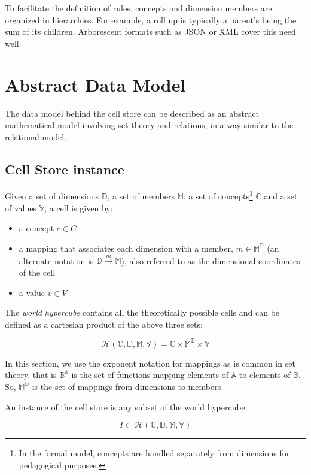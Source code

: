 \documentclass{acm_proc_article-sp}
\begin{document}
To facilitate the definition of rules, concepts and dimension members are organized in hierarchies. For example, a roll up is typically a parent's being the sum of its children. Arborescent formats such as JSON or XML cover this need well.

\section{Abstract Data Model}
\label{section-abstract-data-model}
The data model behind the cell store can be described as an abstract mathematical model involving set theory and relations, in a way similar to the relational model.
\subsection{Cell Store instance}

Given a set of dimensions $\mathbb{D}$, a set of members $\mathbb{M}$, a set of concepts\footnote{In the formal model, concepts are handled separately from dimensions for pedagogical purposes.} $\mathbb{C}$ and a set of values $\mathbb{V}$, a cell is given by:

\vspace{-\topsep}
\begin{itemize}
\item a concept $c \in C$
\item a mapping that associates each dimension with a member, $m \in \mathbb{M}^\mathbb{D}$ (an alternate notation is $\mathbb{D}\stackrel{m}{\longrightarrow}\mathbb{M}$), also referred to as the dimensional coordinates of the cell
\item a value $v \in V$
\end{itemize}

The \emph{world hypercube} contains all the theoretically possible cells and can be defined as a cartesian product of the above three sets:

$$\mathcal{H}(\mathbb{C}, \mathbb{D}, \mathbb{M}, \mathbb{V})=\mathbb{C}\times\mathbb{M}^\mathbb{D}\times\mathbb{V}$$

In this section, we use the exponent notation for mappings as is common in set theory, that is $\mathbb{B}^\mathbb{A}$ is the set of functions mapping elements of $\mathbb{A}$ to elements of $\mathbb{B}$. So, $\mathbb{M}^\mathbb{D}$ is the set of mappings from dimensions to members.

An instance of the cell store is any subset of the world hypercube.

$$I\subset\mathcal{H}(\mathbb{C}, \mathbb{D}, \mathbb{M}, \mathbb{V})$$
\end{document}
